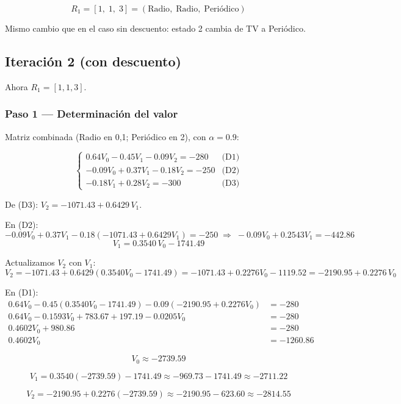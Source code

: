 \documentclass[12pt,a4paper]{article}
\begin{document}
\[
\boxed{ R_1 = [1,\; 1,\; 3] = (\text{Radio},\; \text{Radio},\; \text{Periódico}) }
\]

Mismo cambio que en el caso sin descuento: estado 2 cambia de TV a Periódico.

\newpage

\subsection*{Iteración 2 (con descuento)}

Ahora $R_1 = [1, 1, 3]$.

\subsubsection*{Paso 1 --- Determinación del valor}

Matriz combinada (Radio en 0,1; Periódico en 2), con $\alpha = 0.9$:

\[
\boxed{\begin{cases}
0.64V_0 - 0.45V_1 - 0.09V_2 = -280 & \text{(D1)}\\[4pt]
-0.09V_0 + 0.37V_1 - 0.18V_2 = -250 & \text{(D2)}\\[4pt]
-0.18V_1 + 0.28V_2 = -300 & \text{(D3)}
\end{cases}}
\]

De (D3): $V_2 = -1071.43 + 0.6429\,V_1$.

En (D2):
\[
-0.09V_0 + 0.37V_1 - 0.18(-1071.43 + 0.6429V_1) = -250
\;\Longrightarrow\; -0.09V_0 + 0.2543V_1 = -442.86
\]
\[
\boxed{V_1 = 0.3540\,V_0 - 1741.49}
\]

Actualizamos $V_2$ con $V_1$:
\[
V_2 = -1071.43 + 0.6429(0.3540V_0 - 1741.49)
     = -1071.43 + 0.2276V_0 - 1119.52
     = -2190.95 + 0.2276\,V_0
\]

En (D1):
\[
\begin{aligned}
0.64V_0 - 0.45(0.3540V_0 - 1741.49) - 0.09(-2190.95 + 0.2276V_0) &= -280 \\
0.64V_0 - 0.1593V_0 + 783.67 + 197.19 - 0.0205V_0 &= -280 \\
0.4602V_0 + 980.86 &= -280 \\
0.4602V_0 &= -1260.86
\end{aligned}
\]

\[
\boxed{V_0 \approx -2739.59}
\]

\[
V_1 = 0.3540(-2739.59) - 1741.49 \approx -969.73 - 1741.49 \approx \boxed{-2711.22}
\]

\[
V_2 = -2190.95 + 0.2276(-2739.59) \approx -2190.95 - 623.60 \approx \boxed{-2814.55}
\]
\end{document}
